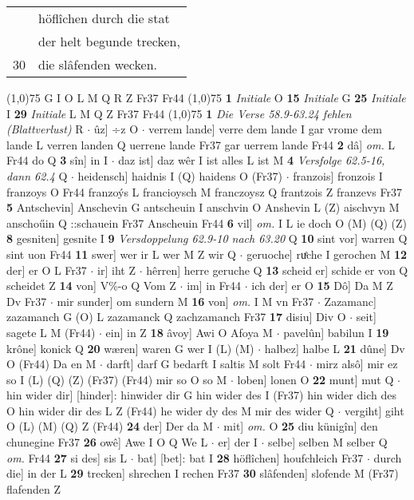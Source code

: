 \documentclass[8pt,a4paper,notitlepage]{article}
\begin{document}
\begin{table}[ht]
\begin{minipage}[t]{0.5\linewidth}
\begin{tabular}{rl}
 & höflîchen durch die stat\\ 
 & der helt begunde trecken,\\ 
30 & die slâfenden wecken.\\ 
\end{tabular}
\scriptsize
\line(1,0){75} \newline
G I O L M Q R Z Fr37 Fr44 \newline
\line(1,0){75} \newline
\textbf{1} \textit{Initiale} O  \textbf{15} \textit{Initiale} G  \textbf{25} \textit{Initiale} I  \textbf{29} \textit{Initiale} L M Q Z Fr37 Fr44  \newline
\line(1,0){75} \newline
\textbf{1} \textit{Die Verse 58.9-63.24 fehlen (Blattverlust)} R   $\cdot$ ûz] ÷z O  $\cdot$ verrem lande] verre dem lande I gar vrome dem lande L verren landen Q uerrene lande Fr37 gar uerrem lande Fr44 \textbf{2} dâ] \textit{om.} L Fr44 do Q \textbf{3} sîn] in I  $\cdot$ daz ist] daz wêr I ist alles L ist M \textbf{4} \textit{Versfolge 62.5-16, dann 62.4} Q   $\cdot$ heidensch] haidnis I (Q) haidens O (Fr37)  $\cdot$ franzois] fronzois I franzoys O Fr44 franzoýs L francioysch M franczoysz Q frantzois Z franzevs Fr37 \textbf{5} Antschevin] Anschevin G antscheuin I anschvin O Anshevin L (Z) aischvyn M anschoűin Q ::schauein Fr37 Anscheuin Fr44 \textbf{6} vil] \textit{om.} I L ie doch O (M) (Q) (Z) \textbf{8} gesniten] gesnite I \textbf{9} \textit{Versdoppelung 62.9-10 nach 63.20} Q  \textbf{10} sint vor] warren Q sint uon Fr44 \textbf{11} swer] wer ir L wer M Z wir Q  $\cdot$ geruoche] ruͤche I gerochen M \textbf{12} der] er O L Fr37  $\cdot$ ir] iht Z  $\cdot$ hêrren] herre geruche Q \textbf{13} scheid er] schide er von Q scheidet Z \textbf{14} von] V\%-o Q Vom Z  $\cdot$ im] in Fr44  $\cdot$ ich der] er O \textbf{15} Dô] Da M Z Dv Fr37  $\cdot$ mir sunder] om sundern M \textbf{16} von] \textit{om.} I M vn Fr37  $\cdot$ Zazamanc] zazamanch G (O) L zazamanck Q zachzamanch Fr37 \textbf{17} disiu] Div O  $\cdot$ seit] sagete L M (Fr44)  $\cdot$ ein] in Z \textbf{18} âvoy] Awi O Afoya M  $\cdot$ pavelûn] babilun I \textbf{19} krône] konick Q \textbf{20} wæren] waren G wer I (L) (M)  $\cdot$ halbez] halbe L \textbf{21} dûne] Dv O (Fr44) Da en M  $\cdot$ darft] darf G bedarft I saltis M solt Fr44  $\cdot$ mirz alsô] mir ez so I (L) (Q) (Z) (Fr37) (Fr44) mir so O so M  $\cdot$ loben] lonen O \textbf{22} munt] mut Q  $\cdot$ hin wider dir] [hinder]: hinwider dir G hin wider des I (Fr37) hin wider dich des O hin wider dir des L Z (Fr44) he wider dy des M mir des wider Q  $\cdot$ vergiht] giht O (L) (M) (Q) Z (Fr44) \textbf{24} der] Der da M  $\cdot$ mit] \textit{om.} O \textbf{25} diu künigîn] den chunegine Fr37 \textbf{26} owê] Awe I O Q We L  $\cdot$ er] der I  $\cdot$ selbe] selben M selber Q \textit{om.} Fr44 \textbf{27} si des] sis L  $\cdot$ bat] [bet]: bat I \textbf{28} höflîchen] houfchleich Fr37  $\cdot$ durch die] in der L \textbf{29} trecken] shrechen I rechen Fr37 \textbf{30} slâfenden] slofende M (Fr37) flafenden Z \newline

\end{minipage}
\end{table}
\end{document}
